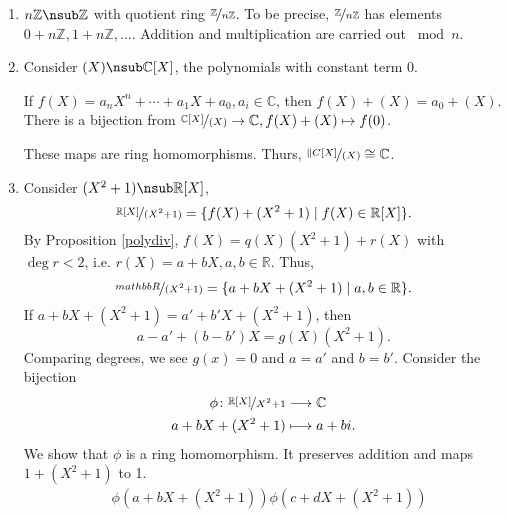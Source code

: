 \begin{example}
    \leavevmode
    \begin{enumerate}
        \item \(n\mathbb{Z}\nsub \mathbb{Z}\) with quotient ring \(\nicefrac{\mathbb{Z}}{n\mathbb{Z}}\). To be precise, \(\nicefrac{\mathbb{Z}}{n\mathbb{Z}}\) has elements \(0 + n\mathbb{Z}, 1 + n\mathbb{Z}, \ldots\).
        Addition and multiplication are carried out \(\bmod n\).
        \item Consider \((X) \nsub \mathbb{C}[X]\), the polynomials with constant term \(0\).

        If \(f(X) = a_n X^n + \cdots + a_1 X + a_0, a_i \in \mathbb{C}\), then \(f(X) + (X) = a_0 + (X)\). There is a bijection from \(\nicefrac{\mathbb{C}[X]}{(X)} \to \mathbb{C}, f(X) + (X) \mapsto f(0)\).

        These maps are ring homomorphisms. Thurs, \(\nicefrac{\|C[X]}{(X)}\cong \mathbb{C}\).
        \item Consider \((X^2 + 1) \nsub \mathbb{R}[X]\),
        \[
            \nicefrac{\mathbb{R}[X]}{(X^2 + 1)} = \{f(X) + (X^2 + 1)\mid f(X) \in \mathbb{R}[X]\}.
        \]
        By Proposition \eqref{polydiv}, \(f(X) = q(X)(X^2 + 1) + r(X)\) with \(\deg r < 2\), i.e. \(r(X) = a + bX, a,b \in \mathbb{R}\). Thus,
        \[\nicefrac{mathbb{R}}{(X^2 + 1)} = \{a + bX + (X^{2} + 1)\mid a, b \in \mathbb{R}\}.\]
        If \(a + bX + (X^2 + 1) = a' + b'X + (X^2 + 1)\), then
        \[a - a' + (b - b')X = g(X)(X^2 + 1).\]
        Comparing degrees, we see \(g(x) = 0\) and \(a = a'\) and \(b = b'\). Consider the bijection
        \begin{equation*}
        \begin{aligned}
          \phi \colon \nicefrac{\mathbb{R}[X]}{X^2 + 1} & \longrightarrow \mathbb{C} \\
                    a + bX + (X^2 + 1) & \longmapsto a + b i.
        \end{aligned}
        \end{equation*}
        We show that \(\phi\) is a ring homomorphism. It preserves addition and maps \(1 + (X^2 + 1)\) to 1.
        \begin{align*}
            &\phi(a + bX + (X^2 + 1))\phi(c + dX + (X^2 + 1))\\
        \end{align*}
    \end{enumerate}
\end{example}